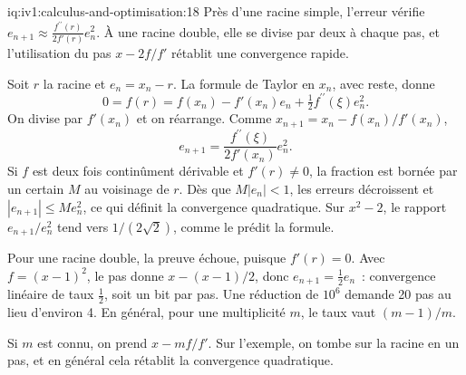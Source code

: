 \begin{solution}{iq:iv1:calculus-and-optimisation:18}
Près d'une racine simple, l'erreur vérifie $e_{n + 1} \approx \frac{f^{\prime\prime}(r)}{2f'(r)}e_n^2$. À une racine double, elle se divise par deux à chaque pas, et l'utilisation du pas $x - 2f/f'$ rétablit une convergence rapide.

Soit $r$ la racine et $e_n = x_n - r$. La formule de Taylor en $x_n$, avec reste, donne
\[
0 = f(r) = f(x_n) - f'(x_n)e_n + \tfrac12 f^{\prime\prime}(\xi)e_n^2.
\]
On divise par $f'(x_n)$ et on réarrange. Comme $x_{n + 1} = x_n - f(x_n)/f'(x_n)$,
\[
e_{n + 1} = \frac{f^{\prime\prime}(\xi)}{2f'(x_n)}e_n^2.
\]
Si $f$ est deux fois continûment dérivable et $f'(r) \ne 0$, la fraction est bornée par un certain $M$ au voisinage de $r$. Dès que $M|e_n| < 1$, les erreurs décroissent et $|e_{n + 1}| \le M e_n^2$, ce qui définit la convergence quadratique. Sur $x^2 - 2$, le rapport $e_{n + 1}/e_n^2$ tend vers $1/(2\sqrt{2})$, comme le prédit la formule.

Pour une racine double, la preuve échoue, puisque $f'(r) = 0$. Avec $f = (x - 1)^2$, le pas donne $x - (x - 1)/2$, donc $e_{n + 1} = \frac12 e_n$~: convergence linéaire de taux $\frac12$, soit un bit par pas. Une réduction de $10^6$ demande 20 pas au lieu d'environ 4. En général, pour une multiplicité $m$, le taux vaut $(m - 1)/m$.

Si $m$ est connu, on prend $x - mf/f'$. Sur l'exemple, on tombe sur la racine en un pas, et en général cela rétablit la convergence quadratique.



\end{solution}

